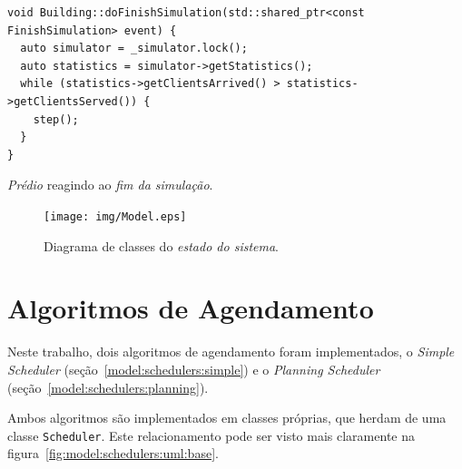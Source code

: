 \begin{description}
    \begin{algorithm}[htb]
      \centering
        \begin{verbatim}
void Building::doFinishSimulation(std::shared_ptr<const FinishSimulation> event) {
  auto simulator = _simulator.lock();
  auto statistics = simulator->getStatistics();
  while (statistics->getClientsArrived() > statistics->getClientsServed()) {
    step();
  }
}
        \end{verbatim}
      \caption{\textit{Prédio} reagindo ao \textit{fim da simulação}.}
      \label{alg:building:finish}
    \end{algorithm}

\end{description}


\begin{figure}[htb!]
  \centering
  \texttt{[image: img/Model.eps]}
  \caption{Diagrama de classes do \textit{estado do sistema}.}
\label{fig:diagram:model}
\end{figure}

\section{\label{model:schedulers}Algoritmos de Agendamento}
Neste trabalho, dois algoritmos de agendamento foram implementados, o
\textit{Simple Scheduler} (seção~\ref{model:schedulers:simple}) e o
\textit{Planning Scheduler} (seção~\ref{model:schedulers:planning}).

Ambos algoritmos são implementados em classes próprias, que herdam de uma classe
\texttt{Scheduler}. Este relacionamento pode ser visto mais claramente na
figura~\ref{fig:model:schedulers:uml:base}.

